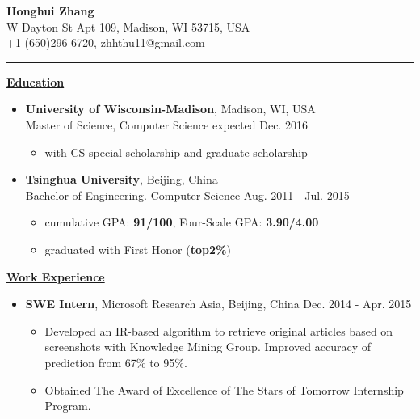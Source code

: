 \documentclass[11pt]{article}
\begin{document}
\begin{CJK}{GBK}{kai}
\begin{center}
  {\textbf{\huge Honghui Zhang}}\\ W Dayton St Apt 109, Madison, WI 53715, USA\\
  +1 (650)296-6720, zhhthu11@gmail.com\\
\end{center}
\rule[4pt]{16.5cm}{0.5pt}
{ \textbf{\underline{Education}}}\\\medskip
\begin{itemize}
  \item \textbf{University of Wisconsin-Madison}, Madison, WI, USA\\
  Master of Science, Computer Science  \hfill expected Dec. 2016\\
    \begin{itemize}
    \item with CS special scholarship and graduate scholarship\\\medskip
    \end{itemize}
 \item \textbf{Tsinghua University}, Beijing, China\\
 Bachelor of Engineering. Computer Science \hfill Aug. 2011 - Jul. 2015\\
    \begin{itemize}
    \item cumulative GPA: \textbf{91/100}, Four-Scale GPA: \textbf{3.90/4.00}
    \item graduated with First Honor (\textbf{top2\%})
    \end{itemize}
\end{itemize}

\bigskip

{ \textbf{\underline{Work Experience}}}\\\medskip

\begin{itemize}
   \item \textbf{SWE Intern}, Microsoft Research Asia, Beijing, China \hfill Dec. 2014 - Apr. 2015\\
     \begin{itemize}
     \item Developed an IR-based algorithm to retrieve original articles based on screenshots with Knowledge Mining Group. Improved accuracy of prediction from 67\% to 95\%.
     \item Obtained The Award of Excellence of The Stars of Tomorrow Internship Program.\\\medskip
     \end{itemize}


\end{itemize}
\end{CJK}
\end{document}

